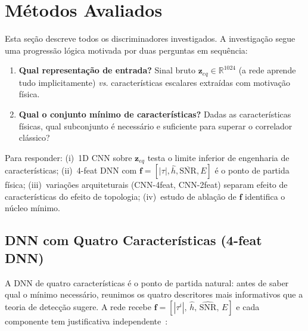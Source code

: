\documentclass[12pt,a4paper]{article}
\begin{document}
\section{Métodos Avaliados}\label{sec:methods}

Esta seção descreve todos os discriminadores investigados. A investigação segue uma progressão lógica motivada por duas perguntas em sequência:

\begin{enumerate}
  \item \textbf{Qual representação de entrada?} Sinal bruto $\mathbf{z}_{eq} \in \mathbb{R}^{1024}$ (a rede aprende tudo implicitamente) \emph{vs.} características escalares extraídas com motivação física.
  \item \textbf{Qual o conjunto mínimo de características?} Dadas as características físicas, qual subconjunto é necessário e suficiente para superar o correlador clássico?
\end{enumerate}

Para responder: (i)~1D CNN sobre $\mathbf{z}_{eq}$ testa o limite inferior de engenharia de características; (ii)~4-feat DNN com $\mathbf{f} = [|\tau|, \hat{h}, \overline{\text{SNR}}, E]$ é o ponto de partida física; (iii)~variações arquiteturais (CNN-4feat, CNN-2feat) separam efeito de características do efeito de topologia; (iv)~estudo de ablação de $\mathbf{f}$ identifica o núcleo mínimo.

\subsection{DNN com Quatro Características (4-feat DNN)}\label{sec:dnn4feat}

A DNN de quatro características é o ponto de partida natural: antes de saber qual o mínimo necessário, reunimos os quatro descritores mais informativos que a teoria de detecção sugere. A rede recebe $\mathbf{f} = [|\tau^i|,\, \hat{h},\, \widehat{\text{SNR}},\, E]$ e cada componente tem justificativa independente~\cite{ref_poor}:
\end{document}
